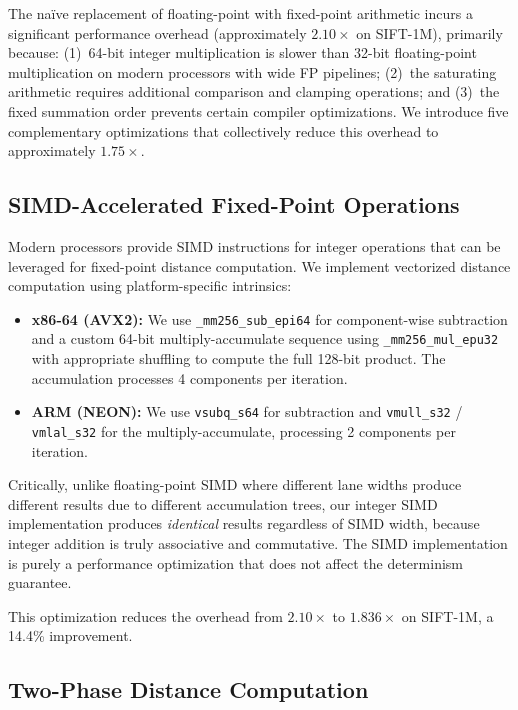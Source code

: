 \documentclass[10pt,journal,compsoc]{IEEEtran}
\begin{document}
The na\"ive replacement of floating-point with fixed-point arithmetic incurs a significant performance overhead (approximately $2.10\times$ on SIFT-1M), primarily because: (1)~64-bit integer multiplication is slower than 32-bit floating-point multiplication on modern processors with wide FP pipelines; (2)~the saturating arithmetic requires additional comparison and clamping operations; and (3)~the fixed summation order prevents certain compiler optimizations. We introduce five complementary optimizations that collectively reduce this overhead to approximately $1.75\times$.

\subsection{SIMD-Accelerated Fixed-Point Operations}

Modern processors provide SIMD instructions for integer operations that can be leveraged for fixed-point distance computation. We implement vectorized distance computation using platform-specific intrinsics:

\begin{itemize}[leftmargin=*]
  \item \textbf{x86-64 (AVX2):} We use \texttt{\_mm256\_sub\_epi64} for component-wise subtraction and a custom 64-bit multiply-accumulate sequence using \texttt{\_mm256\_mul\_epu32} with appropriate shuffling to compute the full 128-bit product. The accumulation processes 4 components per iteration.

  \item \textbf{ARM (NEON):} We use \texttt{vsubq\_s64} for subtraction and \texttt{vmull\_s32} / \texttt{vmlal\_s32} for the multiply-accumulate, processing 2 components per iteration.
\end{itemize}

Critically, unlike floating-point SIMD where different lane widths produce different results due to different accumulation trees, our integer SIMD implementation produces \emph{identical} results regardless of SIMD width, because integer addition is truly associative and commutative. The SIMD implementation is purely a performance optimization that does not affect the determinism guarantee.

This optimization reduces the overhead from $2.10\times$ to $1.836\times$ on SIFT-1M, a 14.4\% improvement.

\subsection{Two-Phase Distance Computation}
\end{document}

